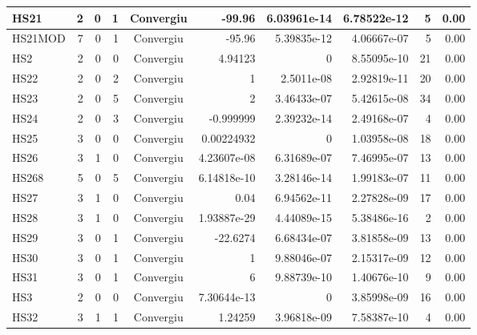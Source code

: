 \begin{center}
\begin{longtable}{|l|r|r|r|c|r|r|r|r|r|}
    HS21 &      2 &      0 &      1 & Convergiu  &      -99.96 &    6.03961e-14 & 6.78522e-12 &      5 &    0.00 \\ \hline
 HS21MOD &      7 &      0 &      1 & Convergiu  &      -95.96 &    5.39835e-12 & 4.06667e-07 &      5 &    0.00 \\ \hline
     HS2 &      2 &      0 &      0 & Convergiu  &     4.94123 &              0 & 8.55095e-10 &     21 &    0.00 \\ \hline
    HS22 &      2 &      0 &      2 & Convergiu  &           1 &     2.5011e-08 & 2.92819e-11 &     20 &    0.00 \\ \hline
    HS23 &      2 &      0 &      5 & Convergiu  &           2 &    3.46433e-07 & 5.42615e-08 &     34 &    0.00 \\ \hline
    HS24 &      2 &      0 &      3 & Convergiu  &   -0.999999 &    2.39232e-14 & 2.49168e-07 &      4 &    0.00 \\ \hline
    HS25 &      3 &      0 &      0 & Convergiu  &  0.00224932 &              0 & 1.03958e-08 &     18 &    0.00 \\ \hline
    HS26 &      3 &      1 &      0 & Convergiu  & 4.23607e-08 &    6.31689e-07 & 7.46995e-07 &     13 &    0.00 \\ \hline
   HS268 &      5 &      0 &      5 & Convergiu  & 6.14818e-10 &    3.28146e-14 & 1.99183e-07 &     11 &    0.00 \\ \hline
    HS27 &      3 &      1 &      0 & Convergiu  &        0.04 &    6.94562e-11 & 2.27828e-09 &     17 &    0.00 \\ \hline
    HS28 &      3 &      1 &      0 & Convergiu  & 1.93887e-29 &    4.44089e-15 & 5.38486e-16 &      2 &    0.00 \\ \hline
    HS29 &      3 &      0 &      1 & Convergiu  &    -22.6274 &    6.68434e-07 & 3.81858e-09 &     13 &    0.00 \\ \hline
    HS30 &      3 &      0 &      1 & Convergiu  &           1 &    9.88046e-07 & 2.15317e-09 &     12 &    0.00 \\ \hline
    HS31 &      3 &      0 &      1 & Convergiu  &           6 &    9.88739e-10 & 1.40676e-10 &      9 &    0.00 \\ \hline
     HS3 &      2 &      0 &      0 & Convergiu  & 7.30644e-13 &              0 & 3.85998e-09 &     16 &    0.00 \\ \hline
    HS32 &      3 &      1 &      1 & Convergiu  &     1.24259 &    3.96818e-09 & 7.58387e-10 &      4 &    0.00 \\ \hline

\end{longtable}
\end{center}
